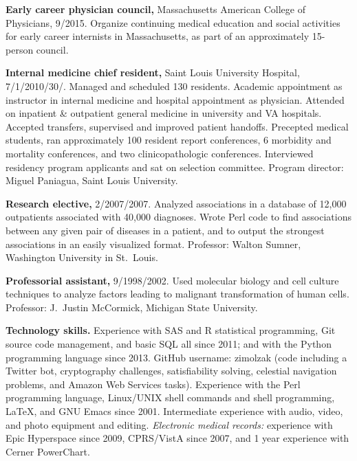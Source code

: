 \documentclass[10pt]{article}
\begin{document}
\textbf{Early career physician council,} Massachusetts American
College of Physicians, 9/\ndash{}2015. Organize
continuing medical education and social activities for early career
internists in Massachusetts, as part of an approximately 15-person
council.

\textbf{Internal medicine chief resident,} Saint Louis University
Hospital, 7/1/2010\ndash{}/30/. Managed
and scheduled 130 residents. Academic appointment as instructor in
internal medicine and hospital appointment as physician. Attended on
inpatient \& outpatient general medicine in university and VA
hospitals. Accepted transfers, supervised and improved patient
handoffs. Precepted medical students, ran approximately 100 resident
report conferences, 6 morbidity and mortality conferences, and two
clinicopathologic conferences. Interviewed residency program
applicants and sat on selection committee. Program director: Miguel
Paniagua, Saint Louis University.

\textbf{Research elective,} 2/2007/2007. Analyzed associations
in a database of 12,000 outpatients associated with 40,000 diagnoses.
Wrote Perl code to find associations between any given pair of
diseases in a patient, and to output the strongest associations in an
easily visualized format. Professor: Walton Sumner, Washington
University in St.\ Louis.

\textbf{Professorial assistant,} 9/1998/2002. Used molecular
biology and cell culture techniques to analyze factors leading to
malignant transformation of human cells. Professor: J.\ Justin
McCormick, Michigan State University.

\textbf{Technology skills.} Experience with SAS and R statistical
programming, Git source code management, and basic SQL all since 2011;
and with the Python programming language since 2013. GitHub username:
zimolzak (code including a Twitter bot, cryptography challenges,
satisfiability solving, celestial navigation problems, and Amazon Web
Services tasks). Experience with the Perl programming language,
Linux/UNIX shell commands and shell programming, \LaTeX, and GNU Emacs
since 2001. Intermediate experience with audio, video, and photo
equipment and editing. \emph{Electronic medical records:} experience
with Epic Hyperspace since 2009, CPRS/VistA since 2007, and 1 year
experience with Cerner PowerChart.
\end{document}
